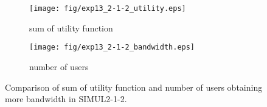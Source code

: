 \begin{figure}
	\begin{center}
		\begin{subfigure}[b]{0.8\textwidth}
			\centering
			\texttt{[image: fig/exp13\_2-1-2\_utility.eps]}
			\caption{sum of utility function}
			\label{figure:simul2_1_2_u_a}
		\end{subfigure}
		\begin{subfigure}[b]{0.8\textwidth}
			\centering
			\texttt{[image: fig/exp13\_2-1-2\_bandwidth.eps]}
			\caption{number of users}
			\label{figure:simul2_1_2_u_b}
		\end{subfigure}
		\caption{Comparison of sum of utility function and number of users obtaining more bandwidth in SIMUL2-1-2.}
		\label{figure:simul2_1_2_u}
	\end{center}
\end{figure}

\clearpage

